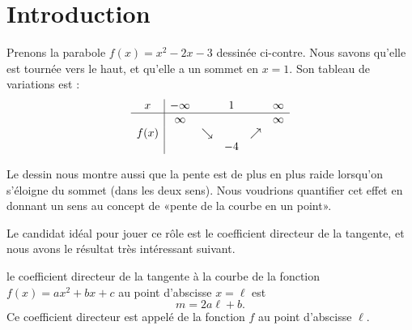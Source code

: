 
\section{Introduction}


\begin{wrapfigure}[14]{r}{7.0cm}
            \vspace{-0.5cm}        %
                \centering
                    
                \end{wrapfigure}
Prenons la parabole \( f(x)=x^2-2x-3\) dessinée ci-contre. Nous savons qu'elle est tournée vers le haut, et qu'elle a un sommet en \( x=1\). Son tableau de variations est :
\begin{equation*}
    \begin{array}[]{c|ccccc}
        x&-\infty&&1&&\infty\\
        \hline
        &\infty&&&&\infty\\
        f(x)&&\searrow&&\nearrow&\\
        &&&-4&&\\
    \end{array}
\end{equation*}

Le dessin nous montre aussi que la pente est de plus en plus raide lorsqu'on s'éloigne du sommet (dans les deux sens). Nous voudrions quantifier cet effet en donnant un sens au concept de «pente de la courbe en un point».

Le candidat idéal pour jouer ce rôle est le coefficient directeur de la tangente, et nous avons le résultat très intéressant suivant.

\begin{Aretenir}
    le coefficient directeur de la tangente à la courbe de la fonction \( f(x)=ax^2+bx+c\) au point d'abscisse \( x=\ell\) est
    \begin{equation}
        m=2a\ell+b.
    \end{equation}
    Ce coefficient directeur est appelé  de la fonction \( f\) au point d'abscisse \( \ell\).
\end{Aretenir}

